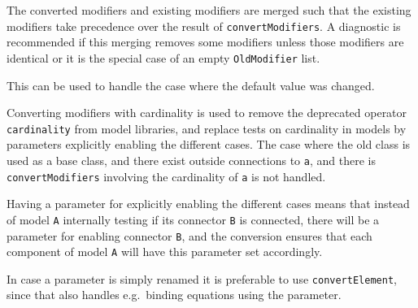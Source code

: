 The converted modifiers and existing modifiers are merged such that the existing modifiers take precedence over the result of \lstinline!convertModifiers!.
A diagnostic is recommended if this merging removes some modifiers unless those modifiers are identical or it is the special case of an empty \lstinline!OldModifier! list.
\begin{nonnormative}
This can be used to handle the case where the default value was changed.
\end{nonnormative}

Converting modifiers with cardinality is used to remove the deprecated operator \lstinline!cardinality! from model libraries, and replace tests on cardinality in models by parameters explicitly enabling the different cases.
The case where the old class is used as a base class, and there exist outside connections to \lstinline!a!, and there is \lstinline!convertModifiers! involving the cardinality of \lstinline!a! is not handled.

\begin{nonnormative}
Having a parameter for explicitly enabling the different cases means that instead of model \lstinline!A! internally testing if its
connector \lstinline!B! is connected, there will be a parameter for enabling connector \lstinline!B!, and the conversion ensures that
each component of model \lstinline!A! will have this parameter set accordingly.

In case a parameter is simply renamed it is preferable to use \lstinline!convertElement!, since that also handles e.g.\ binding equations
using the parameter.
\end{nonnormative}

